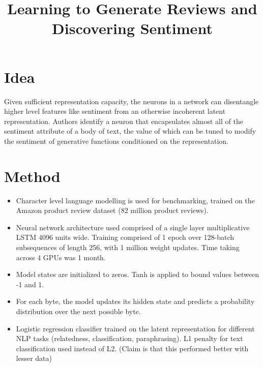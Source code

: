 \documentclass[12pt]{article}
\begin{document}
\title{Learning to Generate Reviews and Discovering Sentiment}
\author{}
\date{}
\maketitle

\section{Idea}
  Given sufficient representation capacity, the neurons in a network can disentangle higher level features like sentiment from an otherwise incoherent latent representation. Authors identify a neuron that encapsulates almost all of the sentiment attribute of a body of text, the value of which can be tuned to modify the sentiment of generative functions conditioned on the representation.

\section{Method}
  \begin{itemize}
    \item Character level language modelling is used for benchmarking, trained on the Amazon product review dataset (82 million product reviews).
    \item Neural network architecture used comprised of a single layer multiplicative LSTM 4096 units wide. Training comprised of 1 epoch over 128-batch subsequences of length 256, with 1 million weight updates. Time taking across 4 GPUs was 1 month.
    \item Model states are initialized to zeros.  Tanh is applied to bound values between -1 and 1.
    \item For each byte, the model updates its hidden state and predicts a probability distribution over the next possible byte.
    \item Logistic regression classifier trained on the latent representation for different NLP tasks (relatedness, classification, paraphrasing). L1 penalty for text classification used instead of L2. (Claim is that this performed better with lesser data)
  \end{itemize}
\end{document}
